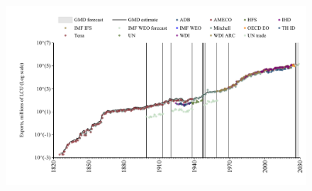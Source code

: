 \documentclass[12pt,a4paper,landscape]{article}
\begin{document}
\begin{adjustbox}{max totalsize={\paperwidth}{\paperheight},center}
\begin{minipage}[t][\textheight][t]{\textwidth}
\begin{figure}[H]
\centering
\includegraphics[width=\textwidth,height=0.6\textheight,keepaspectratio]{graphs/NZL_exports.pdf}
\end{figure}
\end{minipage}
\end{adjustbox}
\end{document}
